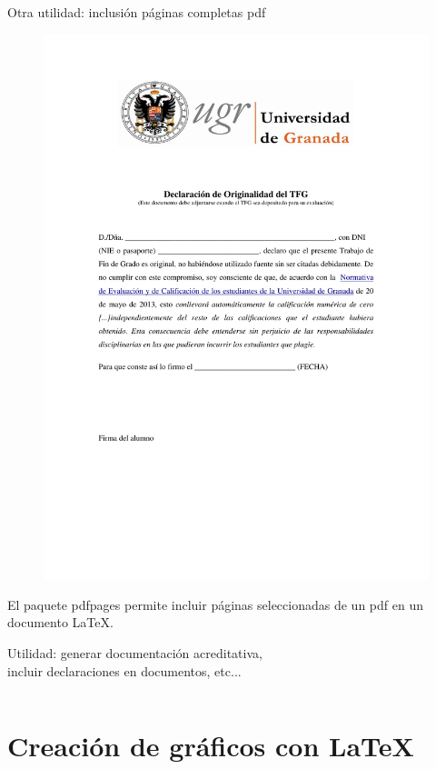 \documentclass[10pt]{beamer}
\begin{document}
\begin{frame}[fragile]{Otra utilidad: inclusión páginas completas pdf}
\vspace{-4cm}
\begin{figure}
\hspace{0.5cm}
\includegraphics[width=5.cm]{../graficos/DeclaraciondeOriginalidadTFG.pdf}
\end{figure}
\vspace{1cm}
El paquete pdfpages \cite{pdfpages} permite incluir páginas seleccionadas de un pdf en un documento \LaTeX{}. 

{\scriptsize Utilidad: generar documentación acreditativa, \\incluir declaraciones en documentos, etc...}

\begin{verbatim}

\end{verbatim}
\end{frame}




\section{Creación de gráficos con LaTeX}
\end{document}
